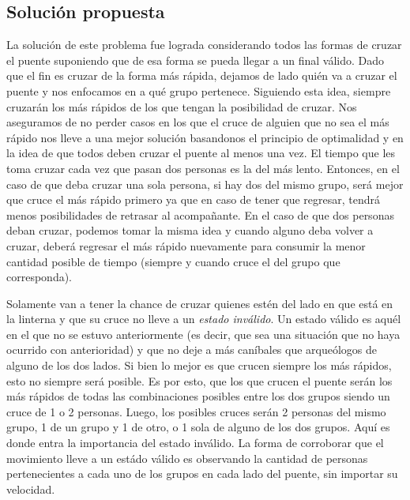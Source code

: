     \subsection{Solución propuesta}
        La solución de este problema fue lograda considerando todos las formas de cruzar el puente suponiendo que de esa forma se pueda llegar a un final válido. Dado que el fin es cruzar de la forma más rápida, dejamos de lado quién va a cruzar el puente y nos enfocamos en a qué grupo pertenece. Siguiendo esta idea, siempre cruzarán los más rápidos de los que tengan la posibilidad de cruzar. Nos aseguramos de no perder casos en los que el cruce de alguien que no sea el más rápido nos lleve a una mejor solución basandonos el principio de optimalidad y en la idea de que todos deben cruzar el puente al menos una vez. El tiempo que les toma cruzar cada vez que pasan dos personas es la del más lento. Entonces, en el caso de que deba cruzar una sola persona, si hay dos del mismo grupo, será mejor que cruce el más rápido primero ya que en caso de tener que regresar, tendrá menos posibilidades de retrasar al acompañante. En el caso de que dos personas deban cruzar, podemos tomar la misma idea y cuando alguno deba volver a cruzar, deberá regresar el más rápido nuevamente para consumir la menor cantidad posible de tiempo (siempre y cuando cruce el del grupo que corresponda).

        Solamente van a tener la chance de cruzar quienes estén del lado en que está en la linterna y que su cruce no lleve a un \emph{estado inválido}. Un estado válido es aquél en el que no se estuvo anteriormente (es decir, que sea una situación que no haya ocurrido con anterioridad) y que no deje a más caníbales que arqueólogos de alguno de los dos lados. Si bien lo mejor es que crucen siempre los más rápidos, esto no siempre será posible. Es por esto, que los que crucen el puente serán los más rápidos de todas las combinaciones posibles entre los dos grupos siendo un cruce de 1 o 2 personas. Luego, los posibles cruces serán 2 personas del mismo grupo, 1 de un grupo y 1 de otro, o 1 sola de alguno de los dos grupos. Aquí es donde entra la importancia del estado inválido. La forma de corroborar que el movimiento lleve a un estádo válido es observando la cantidad de personas pertenecientes a cada uno de los grupos en cada lado del puente, sin importar su velocidad.

